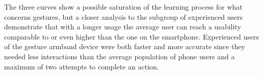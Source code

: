 \documentclass[journal]{./IEEEtran}
\begin{document}
The three curves show a possible saturation of the learning process for what concerns gestures, but a closer analysis to the subgroup of experienced users demonstrate that with a longer usage the average user can reach a usability comparable to or even higher than the one on the smartphone. 
Experienced users of the gesture armband device were both faster and more accurate since they needed less interactions than the average population of phone users and a maximum of two attempts to complete an action.





%
%


%
\end{document}
